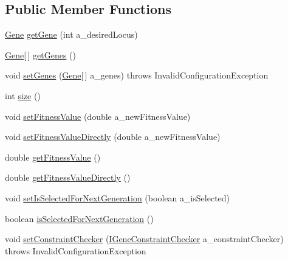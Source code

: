\subsection*{Public Member Functions}
\begin{DoxyCompactItemize}
\item 
\hyperlink{interfaceorg_1_1jgap_1_1_gene}{Gene} \hyperlink{interfaceorg_1_1jgap_1_1_i_chromosome_ac84a3ec514b365e25f023d9e78bfa382}{get\-Gene} (int a\-\_\-desired\-Locus)
\item 
\hyperlink{interfaceorg_1_1jgap_1_1_gene}{Gene}\mbox{[}$\,$\mbox{]} \hyperlink{interfaceorg_1_1jgap_1_1_i_chromosome_a995b4203af3bd22b8fd2028749736a03}{get\-Genes} ()
\item 
void \hyperlink{interfaceorg_1_1jgap_1_1_i_chromosome_a0ff42f1935dab73296301b29ad0a1716}{set\-Genes} (\hyperlink{interfaceorg_1_1jgap_1_1_gene}{Gene}\mbox{[}$\,$\mbox{]} a\-\_\-genes)  throws Invalid\-Configuration\-Exception
\item 
int \hyperlink{interfaceorg_1_1jgap_1_1_i_chromosome_a9b460ad665ea1ab4e789061233fc6fa3}{size} ()
\item 
void \hyperlink{interfaceorg_1_1jgap_1_1_i_chromosome_a56f82d43b102fc5da8e0a071e32dc13d}{set\-Fitness\-Value} (double a\-\_\-new\-Fitness\-Value)
\item 
void \hyperlink{interfaceorg_1_1jgap_1_1_i_chromosome_ac2acf33157b233e8c5553fc62861fa23}{set\-Fitness\-Value\-Directly} (double a\-\_\-new\-Fitness\-Value)
\item 
double \hyperlink{interfaceorg_1_1jgap_1_1_i_chromosome_a9b68991c832a2054176d522e49a19ebd}{get\-Fitness\-Value} ()
\item 
double \hyperlink{interfaceorg_1_1jgap_1_1_i_chromosome_a743303c75d2a001f88af579051862964}{get\-Fitness\-Value\-Directly} ()
\item 
void \hyperlink{interfaceorg_1_1jgap_1_1_i_chromosome_afeeed3697d5f22154cab618432602ca6}{set\-Is\-Selected\-For\-Next\-Generation} (boolean a\-\_\-is\-Selected)
\item 
boolean \hyperlink{interfaceorg_1_1jgap_1_1_i_chromosome_af4aa1487bfa13ba0f038b628f44554be}{is\-Selected\-For\-Next\-Generation} ()
\item 
void \hyperlink{interfaceorg_1_1jgap_1_1_i_chromosome_a05c61ae9fb2caf56455eb66405a164c4}{set\-Constraint\-Checker} (\hyperlink{interfaceorg_1_1jgap_1_1_i_gene_constraint_checker}{I\-Gene\-Constraint\-Checker} a\-\_\-constraint\-Checker)  throws Invalid\-Configuration\-Exception
\item 

\end{DoxyCompactItemize}
